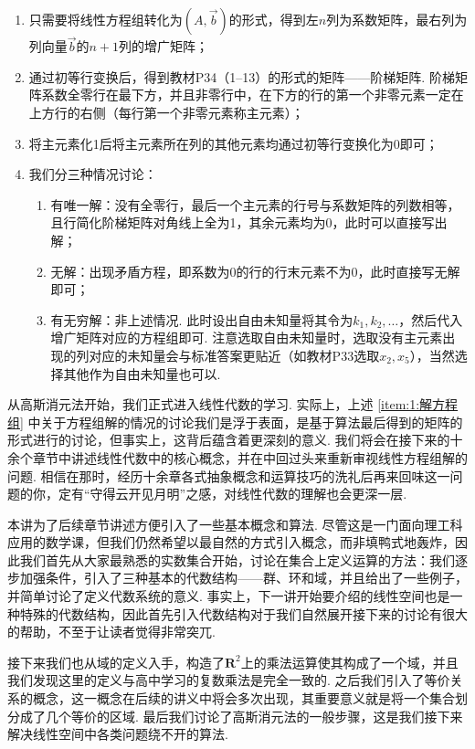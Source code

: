 \begin{enumerate}[label=步骤\arabic*~]
    \item 只需要将线性方程组转化为$(A, \vec{b})$的形式，得到左$n$列为系数矩阵，最右列为列向量$\vec{b}$的$n+1$列的增广矩阵；

    \item 通过初等行变换后，得到教材P34（1--13）的形式的矩阵——阶梯矩阵. 阶梯矩阵系数全零行在最下方，并且非零行中，在下方的行的第一个非零元素一定在上方行的右侧（每行第一个非零元素称主元素）；

    \item 将主元素化1后将主元素所在列的其他元素均通过初等行变换化为0即可；

    \item \label{item:1:解方程组}
          我们分三种情况讨论：
          \begin{enumerate}
              \item 有唯一解：没有全零行，最后一个主元素的行号与系数矩阵的列数相等，且行简化阶梯矩阵对角线上全为1，其余元素均为0，此时可以直接写出解；

              \item 无解：出现矛盾方程，即系数为0的行的行末元素不为0，此时直接写无解即可；

              \item 有无穷解：非上述情况. 此时设出自由未知量将其令为$k_1,k_2,\ldots$，然后代入增广矩阵对应的方程组即可. 注意选取自由未知量时，选取没有主元素出现的列对应的未知量会与标准答案更贴近（如教材P33选取$x_2,x_5$），当然选择其他作为自由未知量也可以.
          \end{enumerate}
\end{enumerate}

从高斯消元法开始，我们正式进入线性代数的学习. 实际上，上述 \ref*{item:1:解方程组} 中关于方程组解的情况的讨论我们是浮于表面，是基于算法最后得到的矩阵的形式进行的讨论，但事实上，这背后蕴含着更深刻的意义. 我们将会在接下来的十余个章节中讲述线性代数中的核心概念，并在中回过头来重新审视线性方程组解的问题. 相信在那时，经历十余章各式抽象概念和运算技巧的洗礼后再来回味这一问题的你，定有``守得云开见月明''之感，对线性代数的理解也会更深一层.

\begin{summary}

    本讲为了后续章节讲述方便引入了一些基本概念和算法. 尽管这是一门面向理工科应用的数学课，但我们仍然希望以最自然的方式引入概念，而非填鸭式地轰炸，因此我们首先从大家最熟悉的实数集合开始，讨论在集合上定义运算的方法：我们逐步加强条件，引入了三种基本的代数结构——群、环和域，并且给出了一些例子，并简单讨论了定义代数系统的意义. 事实上，下一讲开始要介绍的线性空间也是一种特殊的代数结构，因此首先引入代数结构对于我们自然展开接下来的讨论有很大的帮助，不至于让读者觉得非常突兀.

    接下来我们也从域的定义入手，构造了$\mathbf{R}^2$上的乘法运算使其构成了一个域，并且我们发现这里的定义与高中学习的复数乘法是完全一致的. 之后我们引入了等价关系的概念，这一概念在后续的讲义中将会多次出现，其重要意义就是将一个集合划分成了几个等价的区域. 最后我们讨论了高斯消元法的一般步骤，这是我们接下来解决线性空间中各类问题绕不开的算法.

\end{summary}

